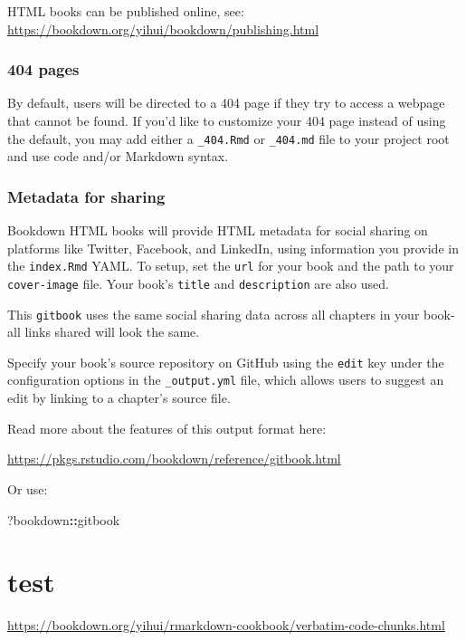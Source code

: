 \documentclass[
]{book}
\newenvironment{Shaded}{\begin{snugshade}}{\end{snugshade}}
\newcommand{\NormalTok}[1]{#1}
\newcommand{\SpecialCharTok}[1]{\textcolor[rgb]{0.81,0.36,0.00}{\textbf{#1}}}
\theoremstyle{definition}
\theoremstyle{definition}
\theoremstyle{definition}
\theoremstyle{definition}
\theoremstyle{remark}
\begin{document}
HTML books can be published online, see: \url{https://bookdown.org/yihui/bookdown/publishing.html}

\subsection{404 pages}\label{pages}

By default, users will be directed to a 404 page if they try to access a webpage that cannot be found. If you'd like to customize your 404 page instead of using the default, you may add either a \texttt{\_404.Rmd} or \texttt{\_404.md} file to your project root and use code and/or Markdown syntax.

\subsection{Metadata for sharing}\label{metadata-for-sharing}

Bookdown HTML books will provide HTML metadata for social sharing on platforms like Twitter, Facebook, and LinkedIn, using information you provide in the \texttt{index.Rmd} YAML. To setup, set the \texttt{url} for your book and the path to your \texttt{cover-image} file. Your book's \texttt{title} and \texttt{description} are also used.

This \texttt{gitbook} uses the same social sharing data across all chapters in your book- all links shared will look the same.

Specify your book's source repository on GitHub using the \texttt{edit} key under the configuration options in the \texttt{\_output.yml} file, which allows users to suggest an edit by linking to a chapter's source file.

Read more about the features of this output format here:

\url{https://pkgs.rstudio.com/bookdown/reference/gitbook.html}

Or use:

\begin{Shaded}
\begin{Highlighting}[]
\NormalTok{?bookdown}\SpecialCharTok{::}\NormalTok{gitbook}
\end{Highlighting}
\end{Shaded}

\chapter{test}\label{test}

\url{https://bookdown.org/yihui/rmarkdown-cookbook/verbatim-code-chunks.html}
\end{document}
